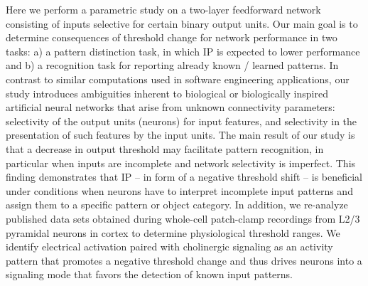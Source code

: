 Here we perform a parametric study on a two-layer feedforward network
        consisting of inputs selective for certain binary output units.
    Our main goal is to determine consequences of threshold change for network performance in two tasks:
        a) a pattern distinction task, in which IP is expected to lower performance
        and b) a recognition task for reporting already known / learned patterns.
    In contrast to similar computations used in software engineering applications,
        our study introduces ambiguities inherent to biological or biologically inspired artificial neural networks
            that arise from unknown connectivity parameters:
                selectivity of the output units (neurons) for input features,
                and selectivity in the presentation of such features by the input units.
    The main result of our study is that a decrease in output threshold may facilitate pattern recognition,
        in particular when inputs are incomplete and network selectivity is imperfect.
    This finding demonstrates that IP -- in form of a negative threshold shift --
        is beneficial under conditions when neurons have to interpret incomplete input patterns and assign them to a specific pattern or object category.
    In addition, we re-analyze published data sets obtained
        during whole-cell patch-clamp recordings from L2/3 pyramidal neurons in cortex
        to determine physiological threshold ranges.
    We identify electrical activation paired with cholinergic signaling
        as an activity pattern that promotes a negative threshold change
        and thus drives neurons into a signaling mode that favors the detection of known input patterns.
